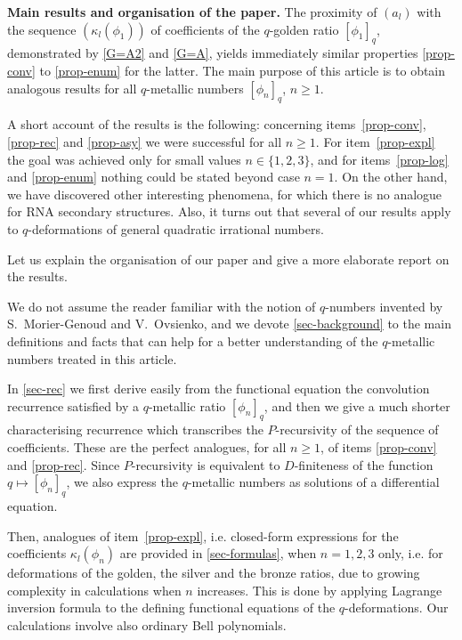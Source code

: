 \documentclass[11pt,reqno]{amsart}
\theoremstyle{plain}
\theoremstyle{definition}
\numberwithin{figure}{section}
\numberwithin{table}{section}
\numberwithin{equation}{section}
\newcommand\ka{\kappa}
\begin{document}
\medbreak \noindent
\textbf{Main results and organisation of the paper.} 
The proximity  of $(a_l)$ with the sequence $(\ka_l(\phi_1))$ of coefficients  of the $q$-golden ratio $[\phi_1]_q$, demonstrated by \eqref{G=A2} and \eqref{G=A}, yields immediately similar properties \ref{prop-conv} to \ref{prop-enum} for the latter.  The main purpose of this article is to obtain analogous results for all $q$-metallic numbers $[\phi_n]_q$, $n≥1$. 

A short account of the results is the following: concerning items~\ref{prop-conv}, \ref{prop-rec} and \ref{prop-asy} we were successful for all $n≥1$. For item~\ref{prop-expl} the goal was achieved only for small values $n\in\{1,2,3\}$, and for items~\ref{prop-log} and \ref{prop-enum} nothing could  be stated beyond case $n=1$. On the other hand, we have  discovered other interesting phenomena, for which there is no analogue for RNA secondary structures. Also, it turns out that several of our results apply  to $q$-deformations of general quadratic irrational numbers.

Let us explain the organisation of our paper and give a more elaborate report on the results.

We do not assume the reader familiar with the notion of $q$-numbers invented by S.~Morier-Genoud and V.~Ovsienko, and we devote \cref{sec-background} to the main definitions and facts that can help for a better understanding of the $q$-metallic numbers treated in this article. 

In \cref{sec-rec} we first derive easily from the functional equation the convolution recurrence satisfied by a $q$-metallic ratio $[\phi_n]_q$,  and then we give a much shorter characterising recurrence which transcribes the $P$-recursivity of the sequence of coefficients. These are the perfect analogues, for all $n≥1$, of items \ref{prop-conv} and \ref{prop-rec}. Since $P$-recursivity is equivalent to $D$-finiteness of the function $q\mapsto [\phi_n]_q$, we also express the $q$-metallic numbers as solutions of a differential equation.

Then,  analogues of item~\ref{prop-expl}, i.e. closed-form expressions for the coefficients $\ka_l(\phi_n)$ are  provided in \cref{sec-formulas}, when $n=1,2,3$ only, i.e. for deformations of the golden, the silver and the bronze ratios, due to growing complexity in  calculations when $n$ increases. This is done by applying Lagrange inversion formula to the defining functional equations of the $q$-deformations. Our calculations involve also ordinary Bell polynomials.
\end{document}
